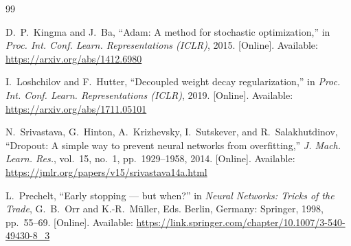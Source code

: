 \documentclass[letterpaper, 10 pt, conference]{ieeeconf}
\begin{document}
\begin{thebibliography}{99}

 D.~P.~Kingma and J.~Ba, ``Adam: A method for stochastic optimization,'' in \emph{Proc. Int. Conf. Learn. Representations (ICLR)}, 2015. [Online]. Available: \url{https://arxiv.org/abs/1412.6980}

 I.~Loshchilov and F.~Hutter, ``Decoupled weight decay regularization,'' in \emph{Proc. Int. Conf. Learn. Representations (ICLR)}, 2019. [Online]. Available: \url{https://arxiv.org/abs/1711.05101}

 N.~Srivastava, G.~Hinton, A.~Krizhevsky, I.~Sutskever, and R.~Salakhutdinov, ``Dropout: A simple way to prevent neural networks from overfitting,'' \emph{J. Mach. Learn. Res.}, vol.~15, no.~1, pp.~1929--1958, 2014. [Online]. Available: \url{https://jmlr.org/papers/v15/srivastava14a.html}

 L.~Prechelt, ``Early stopping --- but when?'' in \emph{Neural Networks: Tricks of the Trade}, G.~B.~Orr and K.-R.~M\"{u}ller, Eds. Berlin, Germany: Springer, 1998, pp.~55--69. [Online]. Available: \url{https://link.springer.com/chapter/10.1007/3-540-49430-8_3}

\end{thebibliography}
\end{document}

